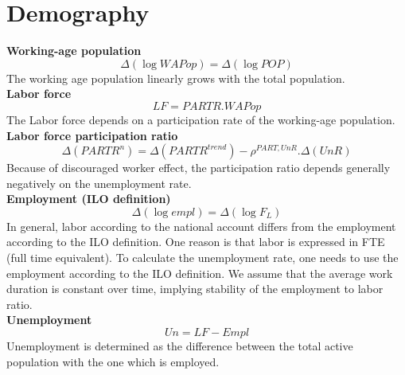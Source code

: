 \documentclass[12pt]{article}
\numberwithin{equation}{section}
\begin{document}
\section{Demography}



\noindent \textbf{Working-age population} 
\begin{dmath}
\varDelta \left(\operatorname{log} WAPop\right) = \varDelta \left(\operatorname{log} POP\right)
\label{demography.mdlWAPop}
\end{dmath}
The working age population linearly grows with the total population. \\

\noindent \textbf{Labor force} 
\begin{dmath}
LF = PARTR . WAPop
\label{demography.mdlLF}
\end{dmath}
The Labor force depends on a participation rate of the working-age population. \\

\noindent \textbf{Labor force participation ratio} 
\begin{dmath}
\varDelta \left(PARTR^{n}\right) = \varDelta \left(PARTR^{trend}\right) - \rho^{PART,UnR} . \varDelta \left(UnR\right)
\label{demography.mdlPARTR_n}
\end{dmath}
Because of discouraged worker effect, the participation ratio depends generally negatively on the unemployment rate. \\

\noindent \textbf{Employment (ILO definition)} 
\begin{dmath}
\varDelta \left(\operatorname{log} empl\right) = \varDelta \left(\operatorname{log} F_{L}\right)
\label{demography.mdlempl}
\end{dmath}
In general, labor according to the national account differs from the employment according to the ILO definition. One reason is that labor is expressed in FTE (full time equivalent). To calculate the unemployment rate, one needs to use the employment according to the ILO definition. We assume that the average work duration is constant over time, implying stability of the employment to labor ratio. \\

\noindent \textbf{Unemployment} 
\begin{dmath}
Un = LF - Empl
\label{demography.mdlUn}
\end{dmath}
Unemployment is determined as the difference between the total active population with the one which is employed. \\
\end{document}
